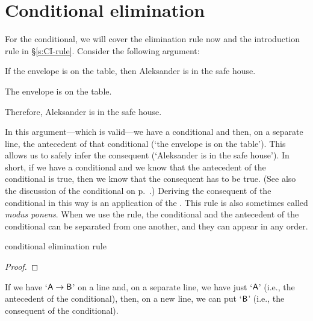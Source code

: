 

\section{Conditional elimination}

For the conditional, we will cover the elimination rule now and the introduction rule in \S \ref{s:CI-rule}. Consider the following argument:
	\begin{earg}
	\item	If the envelope is on the table, then Aleksander is in the safe house.
	\item The envelope is on the table.
	\item Therefore, Aleksander is in the safe house.
	\end{earg}
In this argument---which is valid---we have a conditional and then, on a separate line, the antecedent of that conditional (`the envelope is on the table'). This allows us to safely infer the consequent (`Aleksander is in the safe house'). In short, if we have a conditional and we know that the antecedent of the conditional is true, then we know that the consequent has to be true. (See also the discussion of the conditional on p.~\pageref{characteristic-tt-conditional}.) Deriving the consequent of the conditional in this way is an application of the .
This rule is also sometimes called \emph{modus ponens}. When we use the rule, the conditional and the antecedent of the conditional can be separated from one another, and they can appear in any order.

\medskip


\begin{factboxy}{conditional elimination rule}\label{ce-rule}
\begin{proof}
	 
\end{proof}

\small{If we have `$\mathsf{A}\rightarrow\mathsf{B}$' on a line and, on a separate line, we have just `$\mathsf{A}$' (i.e., the antecedent of the conditional), then, on a new line, we can put `$\mathsf{B}$' (i.e., the consequent of the conditional).} 

\end{factboxy}


